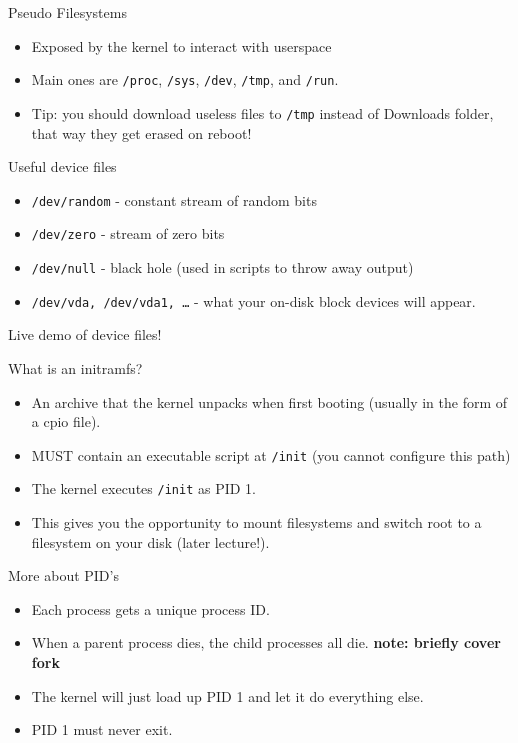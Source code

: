 \documentclass{../lecture}
\begin{document}
\begin{frame}{Pseudo Filesystems}
  \begin{itemize}
    \item Exposed by the kernel to interact with userspace
    \item Main ones are \texttt{/proc}, \texttt{/sys}, \texttt{/dev},
      \texttt{/tmp}, and \texttt{/run}.
    \item Tip: you should download useless files to \texttt{/tmp} instead
      of Downloads folder, that way they get erased on reboot!
  \end{itemize}
  \begin{block}{Useful device files}
    \begin{itemize}
      \item \texttt{/dev/random} - constant stream of random bits
      \item \texttt{/dev/zero} - stream of zero bits
      \item \texttt{/dev/null} - black hole (used in scripts to throw away
        output)
      \item \texttt{/dev/vda, /dev/vda1, \dots} - what your on-disk block
        devices will appear.
    \end{itemize}
    Live demo of device files!
  \end{block}
\end{frame}

\begin{frame}{What is an initramfs?}
  \begin{itemize}
    \item An archive that the kernel unpacks when first booting (usually in the
      form of a cpio file).
    \item MUST contain an executable script at \texttt{/init} (you cannot
      configure this path)
    \item The kernel executes \texttt{/init} as PID 1.
    \item This gives you the opportunity to mount filesystems and switch root to
      a filesystem on your disk (later lecture!).
  \end{itemize}
  \begin{block}{More about PID's}
    \begin{itemize}
      \item Each process gets a unique process ID.
      \item When a parent process dies, the child processes all die.
        \textbf{note: briefly cover fork}
      \item The kernel will just load up PID 1 and let it do everything else.
      \item PID 1 must never exit.
    \end{itemize}
  \end{block}
\end{frame}
\end{document}
